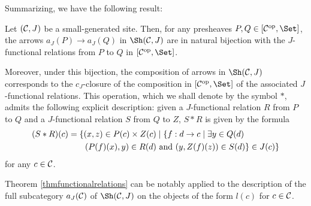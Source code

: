 \documentclass[a4paper,12pt]{article}
\begin{document}
Summarizing, we have the following result:

\begin{theorem}\label{thmfunctionalrelations}
	Let $({\cal C}, J)$ be a small-generated site. Then, for any presheaves $P,Q\in [{\cal C}^{\textup{op}},\Set]$, the arrows $a_{J}(P)\to a_{J}(Q)$ in $\Sh({\cal C}, J)$ are in natural bijection with the $J$-functional relations from $P$ to $Q$ in $[{\cal C}^{\textup{op}},\Set]$.
	
	Moreover, under this bijection, the composition of arrows in $\Sh({\cal C}, J)$ corresponds to the $c_{J}$-closure of the composition in $[{\cal C}^{\textup{op}},\Set]$ of the associated $J$-functional relations. This operation, which we shall denote by the symbol $\ast$, admits the following explicit description: given a $J$-functional relation $R$ from $P$ to $Q$ and a $J$-functional relation $S$ from $Q$ to $Z$, $S\ast R$ is given by the formula
	\begin{equation*}\begin{split}
	(S\ast R)(c)&=\{(x, z)\in P(c)\times Z(c) \mid \{f:d\to c \mid \exists y\in Q(d)\, \\
	& \quad\quad(P(f)(x), y)\in R(d)\textup{ and } (y, Z(f)(z))\in S(d)\}\in J(c) \}
	\end{split}\end{equation*}
	for any $c\in {\cal C}$.
\end{theorem}



Theorem \ref{thmfunctionalrelations} can be notably applied to the description of the full subcategory $a_{J}({\cal C})$ of $\Sh({\cal C}, J)$ on the objects of the form $l(c)$ for $c\in {\cal C}$.
\end{document}
